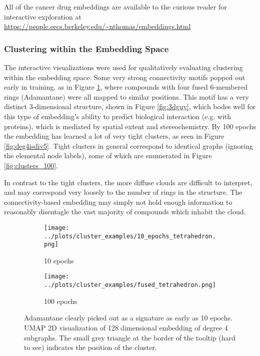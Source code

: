 All of the cancer drug embeddings are available to the curious reader for interactive exploration at \url{https://people.eecs.berkeley.edu/~nthomas/embeddings.html}


\subsubsection{Clustering within the Embedding Space}

The interactive visualizations were used for qualitatively evaluating clustering within the embedding space. Some very strong connectivity motifs popped out early in training, as in Figure \ref{fig:tetrahedron}, where compounds with four fused 6-membered rings (Adamantane) were all mapped to similar positions. This motif has a very distinct 3-dimensional structure, shown in Figure \ref{fig:3dguy}, which bodes well for this type of embedding's ability to predict biological interaction (e.g. with proteins), which is mediated by spatial extent and stereochemistry. By 100 epochs the embedding has learned a lot of very tight clusters, as seen in Figure \ref{fig:deg4isdiv5}. Tight clusters in general correspond to identical graphs (ignoring the elemental node labels), some of which are enumerated in Figure \ref{fig:clusters_100}.

In contrast to the tight clusters, the more diffuse clouds are difficult to interpret, and may correspond very loosely to the number of rings in the structure. The connectivity-based embedding may simply not hold enough information to reasonably disentagle the vast majority of compounds which inhabit the cloud.

\begin{figure}
\centering
\begin{subfigure}{0.45\textwidth}
    \texttt{[image: ../plots/cluster\_examples/10\_epochs\_tetrahedron.png]}
    \caption{10 epochs}
\end{subfigure}
\begin{subfigure}{0.45\textwidth}
    \texttt{[image: ../plots/cluster\_examples/fused\_tetrahedron.png]}
    \caption{100 epochs}
\end{subfigure}
\caption{Adamantane clearly picked out as a signature as early as 10 epochs. UMAP 2D visualization of 128 dimensional embedding of degree 4 subgraphs. The small grey triangle at the border of the tooltip (hard to see) indicates the position of the cluster.}
\label{fig:tetrahedron}
\end{figure}

